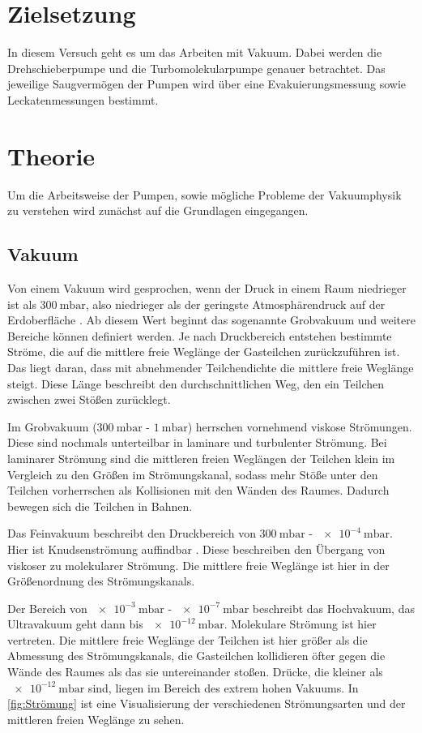 \section{Zielsetzung}
    In diesem Versuch geht es um das Arbeiten mit Vakuum.
    Dabei werden die Drehschieberpumpe und die Turbomolekularpumpe genauer betrachtet.
    Das jeweilige Saugvermögen der Pumpen wird über eine Evakuierungsmessung sowie Leckatenmessungen bestimmt.

\section{Theorie}
\label{sec:Theorie}
    Um die Arbeitsweise der Pumpen, sowie mögliche Probleme der Vakuumphysik zu verstehen wird zunächst auf die Grundlagen eingegangen.
    \subsection{Vakuum}
        Von einem Vakuum wird gesprochen, wenn der Druck in einem Raum niedrieger ist als $\SI{300}{\milli\bar}$, also niedrieger als der geringste Atmosphärendruck auf der Erdoberfläche \cite{Pfeiffer}.
        Ab diesem Wert beginnt das sogenannte Grobvakuum und weitere Bereiche können definiert werden.
        Je nach Druckbereich entstehen bestimmte Ströme, die auf die mittlere freie Weglänge der Gasteilchen zurückzuführen ist.
        Das liegt daran, dass mit abnehmender Teilchendichte die mittlere freie Weglänge steigt.
        Diese Länge beschreibt den durchschnittlichen Weg, den ein Teilchen zwischen zwei Stößen zurücklegt. 

        \noindent
        Im Grobvakuum ($\SI{300}{\milli\bar}$ - $\SI{1}{\milli\bar}$) herrschen vornehmend viskose Strömungen.
        Diese sind nochmals unterteilbar in laminare und turbulenter Strömung.
        Bei laminarer Strömung sind die mittleren freien Weglängen der Teilchen klein im Vergleich zu den Größen im Strömungskanal, sodass mehr Stöße unter den Teilchen vorherrschen als Kollisionen mit den Wänden des Raumes.
        Dadurch bewegen sich die Teilchen in Bahnen.

        \noindent
        Das Feinvakuum beschreibt den Druckbereich von $\SI{300}{\milli\bar}$ - $\SI{e-4}{\milli\bar}$.
        Hier ist Knudsenströmung auffindbar \cite{Pfeiffer}.
        Diese beschreiben den Übergang von viskoser zu molekularer Strömung.
        Die mittlere freie Weglänge ist hier in der Größenordnung des Strömungskanals.

        \noindent
        Der Bereich von $\SI{e-3}{\milli\bar}$ - $\SI{e-7}{\milli\bar}$ beschreibt das Hochvakuum, das Ultravakuum geht dann bis $\SI{e-12}{\milli\bar}$.
        Molekulare Strömung ist hier vertreten.
        Die mittlere freie Weglänge der Teilchen ist hier größer als die Abmessung des Strömungskanals, die Gasteilchen kollidieren öfter gegen die Wände des Raumes als das sie untereinander stoßen.
        \noindent
        Drücke, die kleiner als $\SI{e-12}{\milli\bar}$ sind, liegen im Bereich des extrem hohen Vakuums.
        \noindent
        In \autoref{fig:Strömung} ist eine Visualisierung der verschiedenen Strömungsarten und der mittleren freien Weglänge zu sehen.

